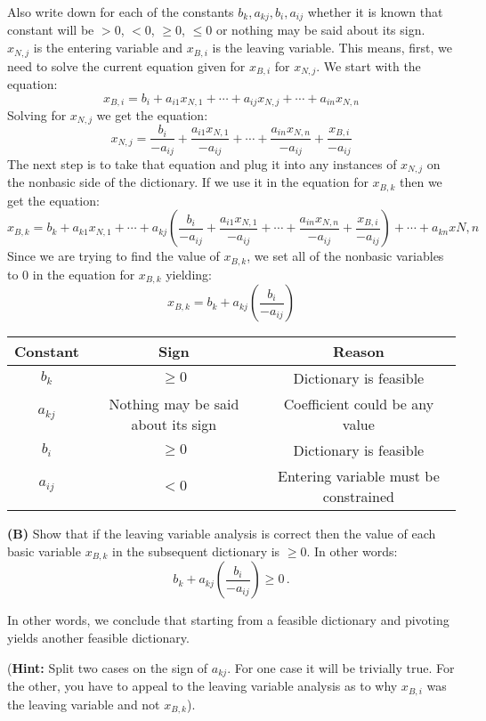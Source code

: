 \documentclass[11pt]{article}
\begin{document}
Also write down for each of the constants $b_k, a_{kj}, b_i, a_{ij}$
whether it is known that constant will be $> 0$, $< 0$, $\geq 0$,
$\leq 0$ or nothing may be said about its sign.
\\
$x_{N,j}$ is the entering variable and $x_{B,i}$ is the leaving variable.  This means, first, we need to solve the current equation given for $x_{B,i}$ for $x_{N,j}$.  We start with the equation:
$$
x_{B,i} = b_i + a_{i1}x_{N,1} + \cdots + a_{ij}x_{N,j} + \cdots + a_{in}x_{N,n}
$$
Solving for $x_{N,j}$ we get the equation:
$$
x_{N,j} = \frac{b_i}{-a_{ij}} + \frac{a_{i1}x_{N,1}}{-a_{ij}} + \cdots + \frac{a_{in}x_{N,n}}{-a_{ij}} + \frac{x_{B,i}}{-a_{ij}}
$$
The next step is to take that equation and plug it into any instances of $x_{N,j}$ on the nonbasic side of the dictionary.  If we use it in the equation for $x_{B,k}$ then we get the equation:
$$
x_{B,k} = b_k + a_{k1}x_{N,1} + \cdots + a_{kj}(\frac{b_i}{-a_{ij}} + \frac{a_{i1}x_{N,1}}{-a_{ij}} + \cdots + \frac{a_{in}x_{N,n}}{-a_{ij}} + \frac{x_{B,i}}{-a_{ij}}) + \cdots + a_{kn}x{N,n}
$$
Since we are trying to find the value of $x_{B,k}$, we set all of the nonbasic variables to 0 in the equation for $x_{B,k}$ yielding:
$$
x_{B,k} = b_k + a_{kj}(\frac{b_i}{-a_{ij}})
$$
\begin{tabular}{|c|c|c|}
\hline
Constant & Sign & Reason\\ \hline
$b_k$ & $\ge 0$ & Dictionary is feasible\\ \hline
$a_{kj}$ & Nothing may be said about its sign & Coefficient could be any value\\  \hline
$b_i$ & $\ge 0$ & Dictionary is feasible\\ \hline
$a_{ij}$ & $< 0$ & Entering variable must be constrained\\ \hline
\end{tabular}

\medskip

\noindent \textbf{(B)} Show that if the leaving variable analysis is
correct then  the value of each basic variable $x_{B,k}$ in the
subsequent 
dictionary is  $\geq 0$. In other words: 
\[  b_k + a_{kj} \left(\frac{b_i}{ - a_{ij}}\right)  \geq 0 \,.\]

In other words, we conclude that starting from a feasible dictionary
and pivoting yields another feasible dictionary.

(\textbf{Hint:} Split two cases on the sign of $a_{kj}$. For one case
it will be trivially true. For the other, you have to appeal to the
leaving variable analysis as to why $x_{B,i}$ was the leaving variable and
not $x_{B,k}$).
\end{document}
